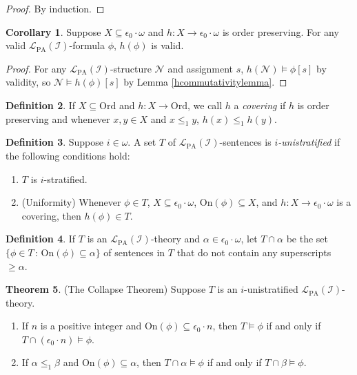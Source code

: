 \documentclass[reqno]{article}
\theoremstyle{definition}
\newtheorem{theorem}{Theorem}
\newtheorem{corollary}[theorem]{Corollary}
\newtheorem{definition}[theorem]{Definition}
\def\L{\mathscr{L}}
\def\LPA{\L_{\mathrm{PA}}}
\def\Ord{\mathrm{Ord}}
\def\epom{\epsilon_0\cdot\omega}
\def\indset{\mathcal I}
\def\onset{\mathrm{On}}
\begin{document}


\begin{proof}
By induction.
\end{proof}

\begin{corollary}
\label{hpreserversvalidity}
Suppose $X\subseteq\epom$ and $h:X\to\epom$ is order preserving.
For any valid $\LPA(\indset)$-formula $\phi$,
$h(\phi)$ is valid.
\end{corollary}

\begin{proof}
For any $\LPA(\indset)$-structure $\mathscr N$ and assignment $s$,
$h(\mathscr N)\models\phi[s]$ by validity, so $\mathscr N\models h(\phi)[s]$
by Lemma \ref{hcommutativitylemma}.
\end{proof}

\begin{definition}
If $X\subseteq\Ord$ and $h:X\to\Ord$, we call $h$ a \emph{covering}
if $h$ is order preserving and whenever $x,y\in X$
and $x\leq_1 y$, $h(x)\leq_1 h(y)$.
\end{definition}

\begin{definition}
Suppose $i\in\omega$.
A set $T$ of $\LPA(\indset)$-sentences is \emph{$i$-unistratified}
if the following conditions hold:
\begin{enumerate}
\item $T$ is $i$-stratified.
\item (Uniformity) Whenever $\phi\in T$,
$X\subseteq\epom$, $\onset(\phi)\subseteq X$, and $h:X\to\epom$ is a covering,
then $h(\phi)\in T$.
\end{enumerate}
\end{definition}

\begin{definition}
If $T$ is an $\LPA(\indset)$-theory and $\alpha\in\epom$,
let $T\cap\alpha$ be the set $\{\phi\in T\,:\,\onset(\phi)\subseteq\alpha\}$ of sentences in $T$ that do not contain
any superscripts $\geq\alpha$.
\end{definition}



\begin{theorem}
\label{collapsetheorem}
(The Collapse Theorem)
Suppose $T$ is an $i$-unistratified $\LPA(\indset)$-theory.
\begin{enumerate}
\item If $n$ is a positive integer and $\onset(\phi)\subseteq\epsilon_0\cdot n$, then $T\models\phi$
if and only if $T\cap(\epsilon_0\cdot n)\models\phi$.
\item If $\alpha\leq_1\beta$ and $\onset(\phi)\subseteq\alpha$, then $T\cap\alpha\models\phi$
if and only if $T\cap\beta\models\phi$.
\end{enumerate}
\end{theorem}
\end{document}
